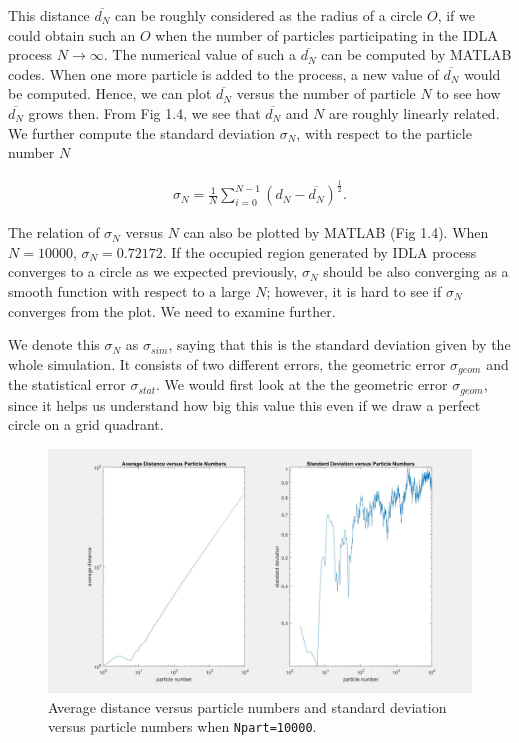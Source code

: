 \documentclass[letterpaper]{article}
\numberwithin{equation}{section} %
\numberwithin{figure}{section} %
\numberwithin{table}{section} %
\begin{document}
\noindent
This distance $\overline{d_N}$ can be roughly considered as the radius of a circle $O$, if we could obtain such an $O$ when the number of particles participating in the IDLA process $N \rightarrow \infty$. The numerical value of such a $\overline{d_N}$ can be computed by MATLAB codes. When one more particle is added to the process, a new value of $\overline{d_N}$ would be computed. Hence, we can plot $\overline{d_N}$ versus the number of particle $N$ to see how $\overline{d_N}$ grows then. From Fig 1.4, we see that $\overline{d_N}$ and $N$ are roughly linearly related. We further compute the standard deviation $\sigma_N$, with respect to the particle number $N$

\begin{align} 
\sigma_N = \frac{1}{N} \sum_{i=0}^{N-1} (d_N-\overline{d_N})^{\frac{1}{2}}.
\end{align}

\noindent
The relation of $\sigma_N$ versus $N$ can also be plotted by MATLAB (Fig 1.4). When $N=10000$, $\sigma_N=0.72172$. If the occupied region generated by IDLA process converges to a circle as we expected previously, $\sigma_N$ should be also converging as a smooth function with respect to a large $N$; however, it is hard to see if $\sigma_N$ converges from the plot. We need to examine further.

We denote this $\sigma_N$ as $\sigma_{sim}$, saying that this is the standard deviation given by the whole simulation. It consists of two different errors, the geometric error $\sigma_{geom}$ and the statistical error $\sigma_{stat}$. We would first look at the the geometric error $\sigma_{geom}$, since it helps us understand how big this value this even if we draw a perfect circle on a grid quadrant.

\begin{figure}[h]
	\centering
	\includegraphics[width=0.7\linewidth]{bdryRandSTD}
	\caption{Average distance versus particle numbers and standard deviation versus particle numbers when \texttt{Npart=10000}.}
	\label{fig:bdryRandSTD}
\end{figure}
\end{document}

